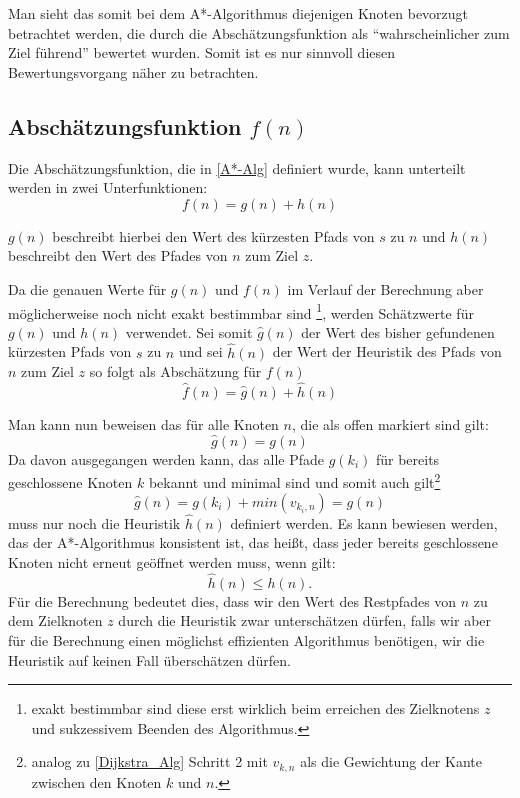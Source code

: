 		Man sieht das somit bei dem A*-Algorithmus diejenigen Knoten bevorzugt betrachtet werden, die durch die Abschätzungsfunktion als "`wahrscheinlicher zum Ziel führend"' bewertet wurden. Somit ist es nur sinnvoll diesen Bewertungsvorgang näher zu betrachten. 
		
	
	
	
	\subsection{Abschätzungsfunktion $f(n)$}
		Die Abschätzungsfunktion, die in \ref{A*-Alg} definiert wurde, kann unterteilt werden in zwei Unterfunktionen\cite{Hart1968}:
		\begin{equation}
			f(n)=g(n)+h(n)
		\end{equation}
		
		$g(n)$ beschreibt hierbei den Wert des kürzesten Pfads von $s$ zu $n$ und $h(n)$ beschreibt den Wert des Pfades von $n$ zum Ziel $z$.
		
		Da die genauen Werte für $g(n)$ und $f(n)$ im Verlauf der Berechnung aber möglicherweise noch nicht exakt bestimmbar sind \footnote{exakt bestimmbar sind diese erst wirklich beim erreichen des Zielknotens $z$ und sukzessivem Beenden des Algorithmus.}, werden Schätzwerte für $g(n)$ und $h(n)$ verwendet. Sei somit $\hat{g}(n)$ der Wert des bisher gefundenen kürzesten Pfads von $s$ zu $n$ und sei $\hat{h}(n)$ der Wert der Heuristik des Pfads von $n$ zum Ziel $z$ so folgt als Abschätzung für $f(n)$
		\begin{equation}
			\hat{f}(n)=\hat{g}(n)+\hat{h}(n)
		\end{equation}
		
		Man kann nun beweisen das für alle Knoten $n$, die als offen markiert sind gilt:
		\begin{equation}
			\hat{g}(n)=g(n)
		\end{equation}
		Da davon ausgegangen werden kann, das alle Pfade $g(k_i)$ für bereits geschlossene Knoten $k$ bekannt und minimal sind und somit auch gilt\footnote{analog zu \ref{Dijkstra_Alg} Schritt 2 mit $v_{k,n}$ als die Gewichtung der Kante zwischen den Knoten $k$ und $n$.}
		\begin{equation}
			\hat{g}(n)=g(k_i)+min(v_{k_i,n})=g(n)
		\end{equation}
		 muss nur noch die Heuristik $\hat{h}(n)$ definiert werden.
		 Es kann bewiesen werden, das der A*-Algorithmus konsistent ist, das heißt, dass jeder bereits geschlossene Knoten nicht erneut geöffnet werden muss, wenn gilt:
		 \begin{equation}
			 \hat{h}(n)\le h(n).
		 \end{equation}
		 Für die Berechnung bedeutet dies, dass wir den Wert des Restpfades von $n$ zu dem Zielknoten $z$ durch die Heuristik zwar unterschätzen dürfen, falls wir aber für die Berechnung einen möglichst effizienten Algorithmus benötigen, wir die Heuristik auf keinen Fall überschätzen dürfen.
		
